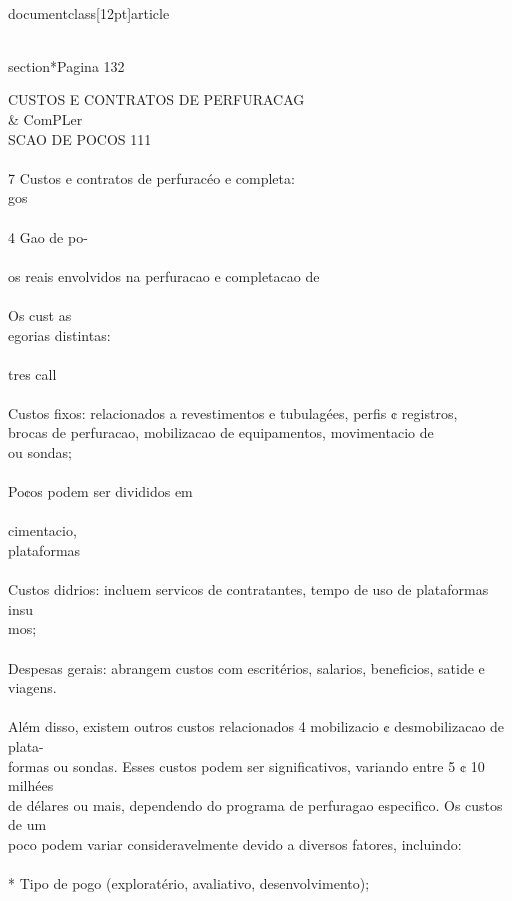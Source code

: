 \\documentclass[12pt]{article}
\begin{document}
\\section*{Pagina 132}

CUSTOS E CONTRATOS DE PERFURACAG \\& ComPLer\\
SCAO DE POCOS 111\\
\\
7 Custos e contratos de perfuracéo e completa:\\
gos\\
\\
4 Gao de po-\\
\\
os reais envolvidos na perfuracao e completacao de\\
\\
Os cust as\\
egorias distintas:\\
\\
tres call\\
\\
Custos fixos: relacionados a revestimentos e tubulagées, perfis ¢ registros,\\
brocas de perfuracao, mobilizacao de equipamentos, movimentacio de\\
ou sondas;\\
\\
Po¢os podem ser divididos em\\
\\
cimentacio,\\
plataformas\\
\\
Custos didrios: incluem servicos de contratantes, tempo de uso de plataformas insu\\
mos;\\
\\
Despesas gerais: abrangem custos com escritérios, salarios, beneficios, satide e viagens.\\
\\
Além disso, existem outros custos relacionados 4 mobilizacio ¢ desmobilizacao de plata-\\
formas ou sondas. Esses custos podem ser significativos, variando entre 5 ¢ 10 milhées\\
de délares ou mais, dependendo do programa de perfuragao especifico. Os custos de um\\
poco podem variar consideravelmente devido a diversos fatores, incluindo:\\
\\
* Tipo de pogo (exploratério, avaliativo, desenvolvimento);\\
\end{document}
